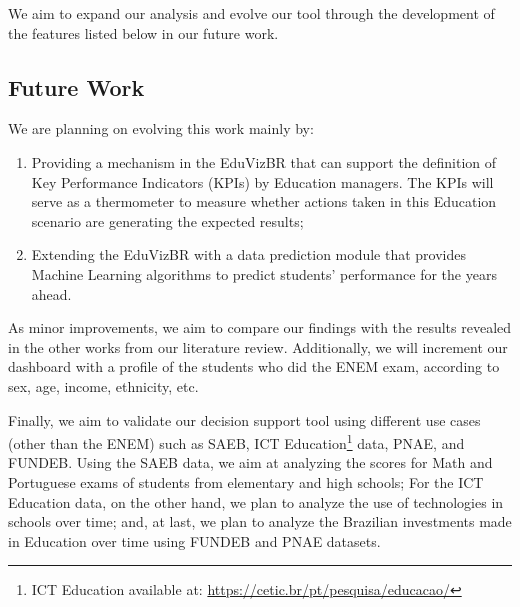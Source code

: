 \documentclass[12pt]{article}
\begin{document}
We aim to expand our analysis and evolve our tool through the development of the features listed below in our future work.

\subsection{Future Work} 

We are planning on evolving this work mainly by: 
\begin{enumerate}
    \item Providing a mechanism in the EduVizBR that can support the definition of Key Performance Indicators (KPIs) by Education managers. The KPIs will serve as a thermometer to measure whether actions taken in this Education scenario are generating the expected results;
    \item Extending the EduVizBR with a data prediction module that provides Machine Learning algorithms to predict students' performance for the years ahead.
\end{enumerate}

As minor improvements, we aim to compare our findings with the results revealed in the other works from our literature review. Additionally, we will increment our dashboard with a profile of the students who did the ENEM exam, according to sex, age, income, ethnicity, etc.

Finally, we aim to validate our decision support tool using different use cases (other than the ENEM) such as SAEB, ICT Education\footnote{ICT Education available at: \url{https://cetic.br/pt/pesquisa/educacao/}} data, PNAE, and FUNDEB. Using the SAEB data, we aim at analyzing the scores for Math and Portuguese exams of students from elementary and high schools; For the ICT Education data, on the other hand, we plan to analyze the use of technologies in schools over time; and, at last, we plan to analyze the Brazilian investments made in Education over time using FUNDEB and PNAE datasets.





\end{document}
